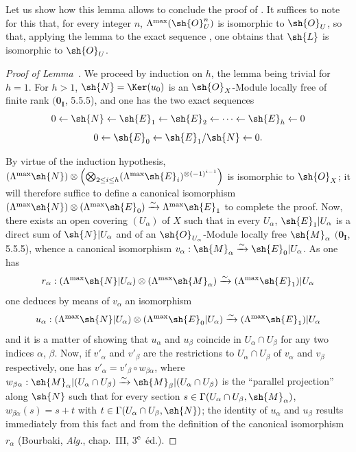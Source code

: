 Let us show how this lemma allows to conclude the proof of .
It suffices to note for this that, for every integer $n$, $\Lambda^{\mathrm{max}}(\sh{O}_U^n)$ is isomorphic to $\sh{O}_U$, so that, applying the lemma to the exact sequence , one obtains that $\sh{L}$ is isomorphic to $\sh{O}_U$.

\begin{proof}[Proof of Lemma~]
We proceed by induction on $h$, the lemma being trivial for $h=1$.
For $h>1$, $\sh{N}=\Ker(u_0)$ is an $\sh{O}_X$-Module locally free of finite rank $(\mathbf{0_I}$, 5.5.5), and one has the two exact sequences
\[
  0\leftarrow\sh{N}\leftarrow\sh{E}_1\leftarrow\sh{E}_2\leftarrow\cdots\leftarrow\sh{E}_h\leftarrow 0
\]
\[
  0\leftarrow\sh{E}_0\leftarrow\sh{E}_1/\sh{N}\leftarrow 0.
\]

By virtue of the induction hypothesis, $(\Lambda^{\mathrm{max}}\sh{N})\otimes\left(\bigotimes_{2\leq i\leq h}(\Lambda^{\mathrm{max}}\sh{E}_i)^{\otimes(-1)^{i-1}}\right)$ is isomorphic to $\sh{O}_X$;
it will therefore suffice to define a canonical isomorphism $(\Lambda^{\mathrm{max}}\sh{N})\otimes(\Lambda^{\mathrm{max}}\sh{E}_0)\xrightarrow{\sim}\Lambda^{\mathrm{max}}\sh{E}_1$ to complete the proof.
Now, there exists an open covering $(U_\alpha)$ of $X$ such that in every $U_\alpha$, $\sh{E}_1|U_\alpha$ is a direct sum of $\sh{N}|U_\alpha$ and of an $\sh{O}_{U_\alpha}$-Module locally free $\sh{M}_\alpha$ $(\mathbf{0_I}$, 5.5.5), whence a canonical isomorphism $v_\alpha:\sh{M}_\alpha\xrightarrow{\sim}\sh{E}_0|U_\alpha$.
As one has
\[
  r_\alpha:(\Lambda^{\mathrm{max}}\sh{N}|U_\alpha)\otimes(\Lambda^{\mathrm{max}}\sh{M}_\alpha)\xrightarrow{\sim}(\Lambda^{\mathrm{max}}\sh{E}_1)|U_\alpha
\]
one deduces by means of $v_\alpha$ an isomorphism
\[
  u_\alpha:(\Lambda^{\mathrm{max}}\sh{N}|U_\alpha)\otimes(\Lambda^{\mathrm{max}}\sh{E}_0|U_\alpha)\xrightarrow{\sim}(\Lambda^{\mathrm{max}}\sh{E}_1)|U_\alpha
\]
and it is a matter of showing that $u_\alpha$ and $u_\beta$ coincide in $U_\alpha\cap U_\beta$ for any two indices $\alpha$, $\beta$.
Now, if $v'_\alpha$ and $v'_\beta$ are the restrictions to $U_\alpha\cap U_\beta$ of $v_\alpha$ and $v_\beta$ respectively, one has $v'_\alpha=v'_\beta\circ w_{\beta\alpha}$, where $w_{\beta\alpha}:\sh{M}_\alpha|(U_\alpha\cap U_\beta)\xrightarrow{\sim}\sh{M}_\beta|(U_\alpha\cap U_\beta)$ is the ``parallel projection'' along $\sh{N}$ such that for every section $s\in\Gamma(U_\alpha\cap U_\beta,\sh{M}_\alpha)$, $w_{\beta\alpha}(s)=s+t$ with $t\in\Gamma(U_\alpha\cap U_\beta,\sh{N})$;
the identity of $u_\alpha$ and $u_\beta$ results immediately from this fact and from the definition of the canonical isomorphism $r_\alpha$ (Bourbaki, \emph{Alg.}, chap.~III, 3\textsuperscript{e}~\'ed.).
\end{proof}

